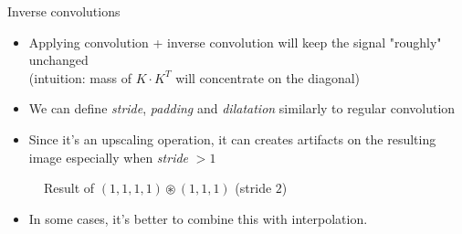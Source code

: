 \documentclass{beamer}
\begin{document}

\begin{frame}{Inverse convolutions}
\begin{itemize}
    \item Applying convolution + inverse convolution will keep the signal "roughly" unchanged\\(intuition: mass of $K\cdot K^T$ will concentrate on the diagonal)
    \item We can define \emph{stride}, \emph{padding} and \emph{dilatation} similarly to regular convolution
    \item Since it's an upscaling operation, it can creates artifacts on the resulting image especially when \emph{stride} $> 1$
\end{itemize}

\begin{figure}
    \centering
    \caption{Result of $(1,1,1,1) \circledast (1,1,1)$ (stride $2$)}
    \label{fig:my_label}
\end{figure}

\begin{itemize}
    \item In some cases, it's better to combine this with interpolation.
\end{itemize}

\end{frame}
\end{document}

